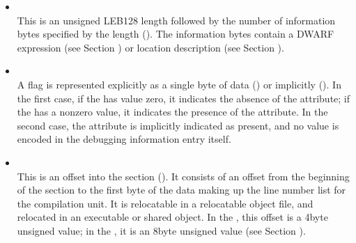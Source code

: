 \begin{itemize}
The data in , 
, 
 and
can be anything. Depending on context, it may
be a signed integer, an unsigned integer, a floating\dash point
constant, or anything else. A consumer must use context to
know how to interpret the bits, which if they are target
machine data (such as an integer or floating point constant)
will be in target machine byte\dash order.

\textit{If one of the \textless n\textgreater 
forms is used to represent a
signed or unsigned integer, it can be hard for a consumer
to discover the context necessary to determine which
interpretation is intended. Producers are therefore strongly
encouraged to use  or 
 for signed and
unsigned integers respectively, rather than 
\textless n\textgreater.}

\item {} \\
This is an unsigned LEB128 length followed by the
number of information bytes specified by the length
(). 
The information bytes contain a DWARF
expression 
(see Section ) 
or location description 
(see Section ).

\item {} \\
A flag 
is represented explicitly as a single byte of data
() or 
implicitly (). 
In the
first case, if the  has value zero, it indicates the
absence of the attribute; if the  has a non\dash zero value,
it indicates the presence of the attribute. In the second
case, the attribute is implicitly indicated as present, and
no value is encoded in the debugging information entry itself.

\item {} \\
This is an offset into 
the 
\dotdebugline{} section
().
It consists of an offset from the
beginning of the 
\dotdebugline{}
section to the first byte of
the data making up the line number list for the compilation
unit. 
It is relocatable in a relocatable object file, and
relocated in an executable or shared object. In the 
\thirtytwobitdwarfformat, this offset is a 4\dash byte unsigned value;
in the \sixtyfourbitdwarfformat, it is an 8\dash byte unsigned value
(see Section ).



\end{itemize}
